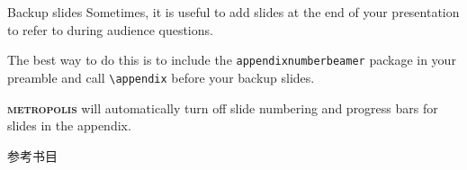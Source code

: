 \documentclass[10pt]{beamer}
\newcommand{\themename}{\textbf{\textsc{metropolis}}\xspace}
\begin{document}
\appendix

\begin{frame}[fragile]{Backup slides}
  Sometimes, it is useful to add slides at the end of your presentation to
  refer to during audience questions.

  The best way to do this is to include the \verb|appendixnumberbeamer|
  package in your preamble and call \verb|\appendix| before your backup slides.

  \themename will automatically turn off slide numbering and progress bars for
  slides in the appendix.
\end{frame}

\begin{frame}[allowframebreaks]{参考书目}

  

\end{frame}
\end{document}
